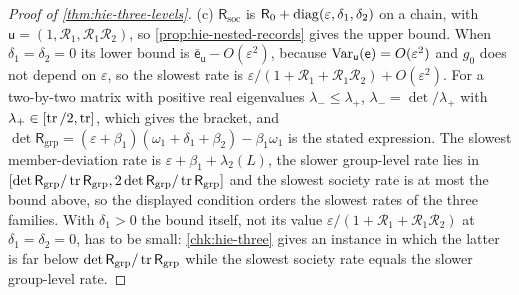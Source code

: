 \begin{proof}[Proof of \cref{thm:hie-three-levels}]
(c) $\mathsf R_{\mathrm{soc}}$ is $\mathsf R_0+\operatorname{diag}(\varepsilon,\delta_1,\delta_2)$ on a chain, with $\mathsf u=(1,\mathcal R_1,\mathcal R_1\mathcal R_2)$, so \cref{prop:hie-nested-records} gives the upper bound. When $\delta_1=\delta_2=0$ its lower bound is $\bar{\mathsf e}_{\mathsf u}-O(\varepsilon^2)$, because $\operatorname{Var}_{\mathsf u}(\mathsf e)=O(\varepsilon^2)$ and $g_0$ does not depend on $\varepsilon$, so the slowest rate is $\varepsilon/(1+\mathcal R_1+\mathcal R_1\mathcal R_2)+O(\varepsilon^2)$. For a two-by-two matrix with positive real eigenvalues $\lambda_-\le\lambda_+$, $\lambda_-=\det/\lambda_+$ with $\lambda_+\in[\operatorname{tr}/2,\operatorname{tr}]$, which gives the bracket, and $\det\mathsf R_{\mathrm{grp}}=(\varepsilon+\beta_1)(\omega_1+\delta_1+\beta_2)-\beta_1\omega_1$ is the stated expression. The slowest member-deviation rate is $\varepsilon+\beta_1+\lambda_2(L)$, the slower group-level rate lies in $[\det\mathsf R_{\mathrm{grp}}/\operatorname{tr}\mathsf R_{\mathrm{grp}},2\det\mathsf R_{\mathrm{grp}}/\operatorname{tr}\mathsf R_{\mathrm{grp}}]$ and the slowest society rate is at most the bound above, so the displayed condition orders the slowest rates of the three families. With $\delta_1>0$ the bound itself, not its value $\varepsilon/(1+\mathcal R_1+\mathcal R_1\mathcal R_2)$ at $\delta_1=\delta_2=0$, has to be small: \cref{chk:hie-three} gives an instance in which the latter is far below $\det\mathsf R_{\mathrm{grp}}/\operatorname{tr}\mathsf R_{\mathrm{grp}}$ while the slowest society rate equals the slower group-level rate.
\end{proof}
